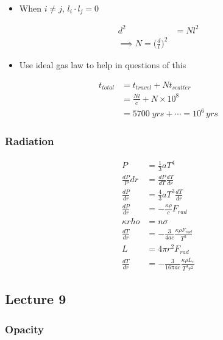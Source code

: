 \documentclass[a4paper,11pt,normalem]{article}
\begin{document}
\begin{itemize}
\item
  When \(i \neq j\), \(l_i \cdot l_j = 0\)
\end{itemize}

\[
    \begin{aligned}
    d^2 &= Nl^2 \\
    \implies N = \bigg(\frac{d}{l}\bigg)^2
    \end{aligned}
\]

\begin{itemize}
\item
  Use ideal gas law to help in questions of this
\end{itemize}

\[
    \begin{aligned}
    t_{total} &= t_{travel} + Nt_{scatter} \\
    &= \frac{Nl}{c} + N\times 10^8 \\
    &= 5700\;yrs + \cdots = 10^6 \, yrs
    \end{aligned}
\]

\subsubsection{Radiation}\label{radiation}

\[
    \begin{aligned}
    P &= \frac{1}{3}a T^4 \\
    \frac{dP}P{dr} &= \frac{dP}{dT}\frac{dT}{dr} \\
    \frac{dP}{dr} &= \frac{4}{3}a T^3 \frac{dT}{dr} \\
    \frac{dP}{dr} &= -\frac{\kappa\rho}{c}F_{rad} \\
    \kappa rho &= n\sigma \\
    \frac{dT}{dr} &= -\frac{3}{4ac}\frac{\kappa\rho F_{rad}}{T^3} \\
    L &= 4\pi r^2 F_{rad} \\
    \frac{dT}{dr} &= -\frac{3}{16\pi ac}\frac{\kappa\rho L_r}{T^3 r^2}
    \end{aligned}
\]

\subsection{Lecture 9}\label{lecture-9}

\subsubsection{Opacity}\label{opacity}
\end{document}
